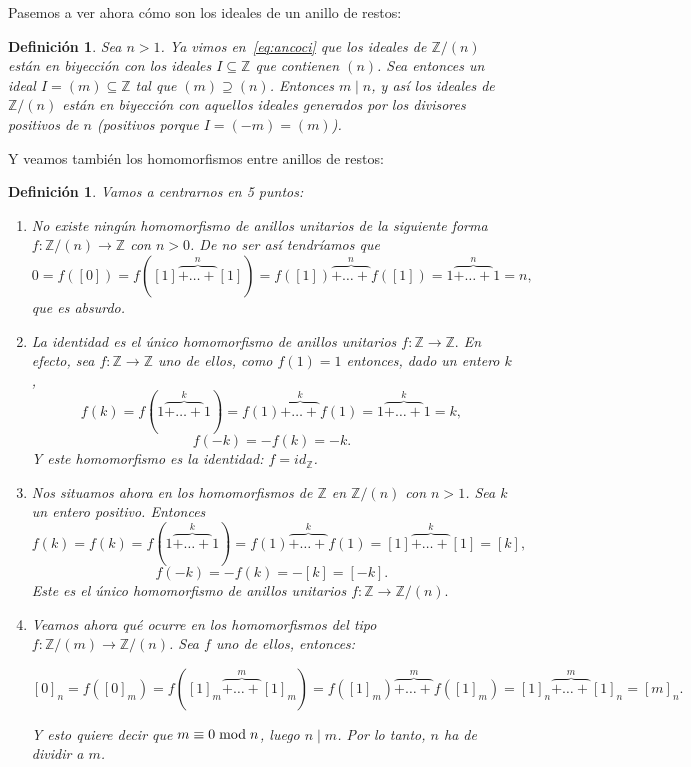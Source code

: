 \documentclass[12pt]{article}
\newtheorem{definition}[theorem]{Definición}
\begin{document}
Pasemos a ver ahora cómo son los ideales de un anillo de restos:

\begin{definition} Sea $n > 1$. Ya vimos en~\ref{eq:ancoci} que los ideales de $\mathbb{Z}/(n)$ están en biyección con los ideales $I \subseteq \mathbb{Z}$ que contienen $(n)$. Sea entonces un ideal $I = (m) \subseteq \mathbb{Z}$ tal que $(m) \supseteq (n)$. Entonces $m \mid n$, y así los ideales de $\mathbb{Z}/(n)$ están en biyección con aquellos ideales generados por los divisores positivos de $n$ (positivos porque $I = (-m) = (m)$).
\end{definition}

Y veamos también los homomorfismos entre anillos de restos:
\begin{definition} Vamos a centrarnos en 5 puntos:\begin{enumerate}
\item No existe ningún homomorfismo de anillos unitarios de la siguiente forma $f \colon \mathbb{Z}/(n) \longrightarrow \mathbb{Z}$ con $n > 0$. De no ser así tendríamos que $$0 = f([0]) = f([1] \overbrace{+ \ldots +}^{n} [1]) = f([1]) \overbrace{+ \ldots +}^{n} f([1])= 1 \overbrace{+ \ldots +}^{n} 1 = n,$$ que es absurdo.
\item La identidad es el único homomorfismo de anillos unitarios $f \colon \mathbb{Z} \longrightarrow \mathbb{Z}.$ En efecto, sea $f \colon \mathbb{Z} \longrightarrow \mathbb{Z}$ uno de ellos, como $f(1) = 1$ entonces, dado un entero $k$, $$f(k) = f(1 \overbrace{+ \ldots +}^{k} 1) = f(1) \overbrace{+ \ldots +}^{k}  f(1) = 1 \overbrace{+ \ldots +}^{k}  1 = k,$$ $$f(-k) = -f(k) = -k.$$ Y este homomorfismo es la identidad: $f = id_{\mathbb{Z}}$.
\item Nos situamos ahora en los homomorfismos de $\mathbb{Z}$ en $\mathbb{Z}/(n)$ con $n>1$. Sea $k$ un entero positivo. Entonces $$f(k) = f(k) = f(1 \overbrace{+ \ldots +}^{k} 1) = f(1) \overbrace{+ \ldots +}^{k}  f(1) = [1]  \overbrace{+ \ldots +}^{k}  [1] = [k],$$ $$f(-k) = -f(k) = -[k] = [-k].$$ Este es el único homomorfismo de anillos unitarios $f \colon \mathbb{Z} \longrightarrow \mathbb{Z}/(n).$
\item Veamos ahora qué ocurre en los homomorfismos del tipo $f \colon \mathbb{Z}/(m) \longrightarrow \mathbb{Z}/(n)$. Sea $f$ uno de ellos, entonces: \begin{center}$[0]_{n} = f([0]_{m}) = f([1]_{m} \overbrace{+ \ldots +}^{m}  [1]_{m}) =   f([1]_{m})  \overbrace{+ \ldots +}^{m}  f([1]_{m}) =  [1]_{n}  \overbrace{+ \ldots +}^{m}  [1]_{n} = [m]_{n}.$\end{center} Y esto quiere decir que $m \equiv 0 \hspace{0.1cm} \text{mod} \hspace{0.1cm} n$, luego $n \mid m$. Por lo tanto, $n$ ha de dividir a $m$.

\end{enumerate}
\end{definition}
\end{document}
